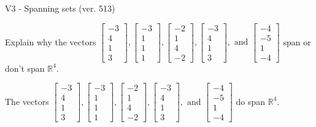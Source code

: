 \begin{exercise}
  \begin{exerciseTitle}V3 - Spanning sets (ver. 513)\end{exerciseTitle}
  \begin{exerciseStatement}
    Explain why the vectors \(\left[\begin{array}{r}
-3 \\
4 \\
1 \\
3
\end{array}\right] , \left[\begin{array}{r}
-3 \\
1 \\
1 \\
1
\end{array}\right] , \left[\begin{array}{r}
-2 \\
1 \\
4 \\
-2
\end{array}\right] , \left[\begin{array}{r}
-3 \\
4 \\
1 \\
3
\end{array}\right] , \text{ and } \left[\begin{array}{r}
-4 \\
-5 \\
1 \\
-4
\end{array}\right]\) span or don't span \(\mathbb{R}^4\). 
	


  \end{exerciseStatement}
  \begin{exerciseAnswer}
   The vectors \(\left[\begin{array}{r}
-3 \\
4 \\
1 \\
3
\end{array}\right] , \left[\begin{array}{r}
-3 \\
1 \\
1 \\
1
\end{array}\right] , \left[\begin{array}{r}
-2 \\
1 \\
4 \\
-2
\end{array}\right] , \left[\begin{array}{r}
-3 \\
4 \\
1 \\
3
\end{array}\right] , \text{ and } \left[\begin{array}{r}
-4 \\
-5 \\
1 \\
-4
\end{array}\right]\) 
  	 do  
	span \(\mathbb{R}^4\).
  



\end{exerciseAnswer}
\end{exercise}
